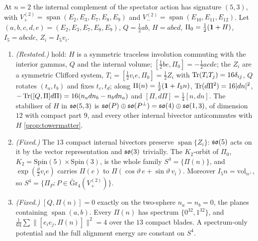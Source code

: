 \begin{proposition}
\label{p1:prop:n2}
At $n=2$ the internal complement of the spectator action has signature $(5,3)$, with $V_+^{(2)}=\operatorname{span}(E_2,E_3,E_7,E_8,E_9)$ and
$V_-^{(2)}=\operatorname{span}(E_{10},E_{11},E_{12})$. Let $(a,b,c,d,e)=(E_2,E_3,E_7,E_8,E_9)$, $Q=\tfrac12ab$, $H=abcd$, $\Pi_0=\tfrac12(\mathbf 1+H)$, $I_5=abcde$, $Z_i=I_5v_i$.
\begin{enumerate}[label=(\roman*),leftmargin=2.2em]
\item \emph{(Restated.)}  hold: $H$ is a symmetric traceless involution commuting with the interior gammas, $Q$ and the
internal volume; $[\tfrac12be,\Pi_0]=-\tfrac12acde$; the $Z_i$ are a symmetric Clifford system, $T_i=[\tfrac12v_ie,\Pi_0]=\tfrac12Z_i$ with $\operatorname{Tr}(T_iT_j)=16\delta_{ij}$, $Q$
rotates $(t_a,t_b)$ and fixes $t_c,t_d$; along $\Pi(n)=\tfrac12(\mathbf 1+I_5n)$, $\operatorname{Tr}(d\Pi^2)=16|dn|^2$, $-\operatorname{Tr}([Q,\Pi]d\Pi)=16(n_adn_b-n_bdn_a)$ and $[\Pi,d\Pi]=\tfrac14[n,dn]$.
The stabiliser of $H$ in $\mathfrak{so}(5,3)$ is $\mathfrak{so}(P)\oplus\mathfrak{so}(P^\perp)=\mathfrak{so}(4)\oplus\mathfrak{so}(1,3)$, of dimension $12$ with compact part $9$, and every other internal bivector
anticommutes with $H$ \cref{prop:towermatter}.
\item \emph{(Fixed.)} The $13$ compact internal bivectors preserve $\operatorname{span}\{Z_i\}$: $\mathfrak{so}(5)$ acts on it by the vector representation and $\mathfrak{so}(3)$
trivially. The $K_2$-orbit of $\Pi_0$, $K_2=\mathrm{Spin}(5)\times\mathrm{Spin}(3)$, is the whole family $S^4=\{\Pi(n)\}$, and
$\exp(\tfrac\vartheta2v_ie)$ carries $\Pi(e)$ to $\Pi(\cos\vartheta\,e+\sin\vartheta\,v_i)$. Moreover $I_5n=\mathrm{vol}_{n^\perp}$, so $S^4=\{\Pi_P:P\in\widetilde{\mathrm{Gr}}_4(V_+^{(2)})\}$.
\item \emph{(Fixed.)} $[Q,\Pi(n)]=0$ exactly on the two-sphere $n_a=n_b=0$, the planes containing $\operatorname{span}(a,b)$. Every $\Pi(n)$ has spectrum
$\{0^{32},1^{32}\}$, and $\tfrac1{64}\sum\|[e_ie_j,\Pi(n)]\|^2=4$ over the $13$ compact blades. A spectrum-only potential and the full alignment energy are
constant on $S^4$.
\end{enumerate}
\end{proposition}

